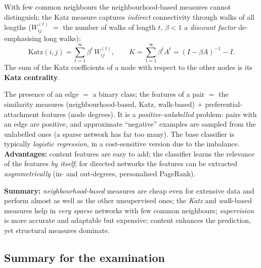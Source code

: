\documentclass[11pt,a4paper]{article}
\theoremstyle{definition}
\providecommand{\uv}[1]{``#1''}
\begin{document}
\begin{defbox}
With few common neighbours the neighbourhood-based measures cannot distinguish; the Katz
measure captures \emph{indirect} connectivity through walks of all lengths ($W_{ij}^{(t)}$
$=$ the number of walks of length $t$, $\beta<1$ a \emph{discount factor} de-emphasising
long walks):
\[ \mathrm{Katz}(i,j)=\sum_{t=1}^{\infty}\beta^{t}\,W_{ij}^{(t)},\qquad
   K=\sum_{t=1}^{\infty}\beta^{t}A^{t}=(I-\beta A)^{-1}-I. \]
The sum of the Katz coefficients of a node with respect to the other nodes is its
\textbf{Katz centrality}.
\end{defbox}

\begin{defbox}
The presence of an edge $=$ a binary class; the features of a pair $=$ the similarity
measures (neighbourhood-based, Katz, walk-based) $+$ preferential-attachment features (node
degrees). It is a \emph{positive-unlabelled} problem: pairs with an edge are positive, and
approximate \uv{negative} examples are sampled from the unlabelled ones (a sparse network has
far too many). The base classifier is typically \emph{logistic regression}, in a
cost-sensitive version due to the imbalance. \textbf{Advantages:} content features are easy
to add; the classifier learns the relevance of the features \emph{by itself}; for directed
networks the features can be extracted \emph{asymmetrically} (in- and out-degrees,
personalised PageRank).
\end{defbox}

\textbf{Summary:} \emph{neighbourhood-based} measures are cheap even for extensive data and
perform almost as well as the other unsupervised ones; the \emph{Katz} and \emph{walk}-based
measures help in \emph{very sparse} networks with few common neighbours; \emph{supervision}
is more accurate and adaptable but expensive; content enhances the prediction, yet structural
measures dominate.

\subsection{Summary for the examination}
\end{document}
